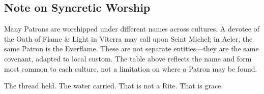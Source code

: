 \subsection{Note on Syncretic Worship}

Many Patrons are worshipped under different names across cultures. A devotee of the Oath of Flame \& Light in Viterra may call upon Seint Michel; in Aeler, the same Patron is the Everflame. These are not separate entities—they are the same covenant, adapted to local custom. The table above reflects the name and form most common to each culture, not a limitation on where a Patron may be found.

The thread held. The water carried. That is not a Rite. That is grace.
